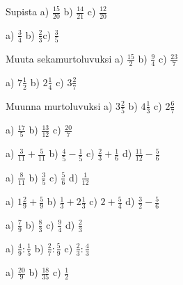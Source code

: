 \begin{tehtava}
Supista \quad
a) $\frac{15}{20}$ \qquad b) $\frac{14}{21}$ \qquad c) $\frac{12}{20}$
\begin{vastaus}
a) $\frac{3}{4}$ \qquad b) $\frac{2}{3}$\qquad c) $\frac{3}{5}$
\end{vastaus}
\end{tehtava}

\begin{tehtava}
Muuta sekamurtoluvuksi \quad
a) $\frac{15}{2}$ \qquad b) $\frac{9}{4}$ \qquad c) $\frac{23}{7}$
\begin{vastaus}
a) $7\frac{1}{2}$ \qquad b) $2\frac{1}{4}$ \qquad c) $3\frac{2}{7}$
\end{vastaus}
\end{tehtava}

\begin{tehtava}
Muunna murtoluvuksi \quad
a) $3\frac{2}{5}$ \qquad b) $4\frac{1}{3}$ \qquad c) $2\frac{6}{7}$
\begin{vastaus}
a) $\frac{17}{5}$ \qquad b) $\frac{13}{12}$ \qquad c) $\frac{20}{7}$
\end{vastaus}
\end{tehtava}

\begin{tehtava}
a) $\frac{3}{11}+\frac{5}{11}$ \qquad b) $\frac{4}{5}-\frac{1}{5}$ \qquad c) $\frac{2}{3}+\frac{1}{6}$ \qquad
d) $ \frac{11}{12}-\frac{5}{6}$
\begin{vastaus}
a) $\frac{8}{11}$ \qquad b) $\frac{3}{5}$ \qquad c) $\frac{5}{6}$ \qquad d) $\frac{1}{12}$
\end{vastaus}
\end{tehtava}

\begin{tehtava}
a) $1\frac{2}{9}+\frac{5}{9}$ \qquad b) $\frac{1}{3}+2\frac{1}{3}$ \qquad c) $2+\frac{5}{4}$ \qquad
d) $ \frac{3}{2}-\frac{5}{6}$
\begin{vastaus}
a) $\frac{7}{9}$ \qquad b) $\frac{8}{3}$ \qquad c) $\frac{9}{4}$ \qquad d) $\frac{2}{3}$
\end{vastaus}
\end{tehtava}


\begin{tehtava}
a) $\frac{4}{9} : \frac{1}{5}$ \qquad b) $\frac{2}{7}:\frac{5}{9}$ \qquad c) $\frac{2}{3}:\frac{4}{3}$
\begin{vastaus}
a) $\frac{20}{9}$ \qquad b) $\frac{18}{35}$ \qquad c) $\frac{1}{2}$
\end{vastaus}
\end{tehtava}

